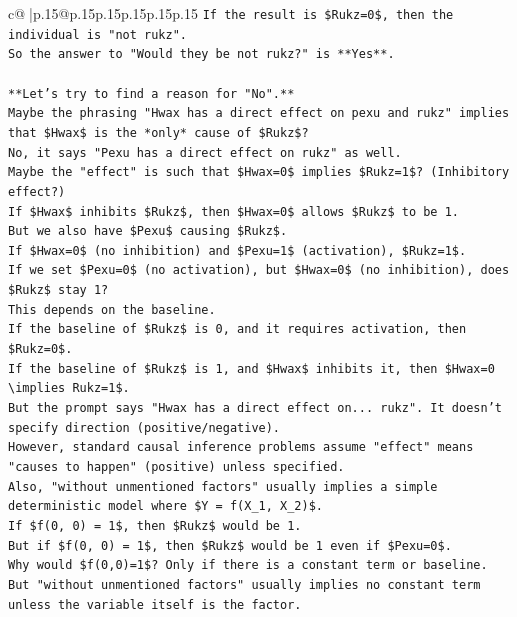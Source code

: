 \documentclass{article}
\begin{document}
{\begin{supertabular}{c@{$\;$}|p{.15\linewidth}@{}p{.15\linewidth}p{.15\linewidth}p{.15\linewidth}p{.15\linewidth}p{.15\linewidth}}
{{{\texttt{If the result is \$Rukz=0\$, then the individual is "not rukz".} \\
\texttt{So the answer to "Would they be not rukz?" is **Yes**.} \\
\\ 
\texttt{**Let's try to find a reason for "No".**} \\
\texttt{Maybe the phrasing "Hwax has a direct effect on pexu and rukz" implies that \$Hwax\$ is the *only* cause of \$Rukz\$?} \\
\texttt{No, it says "Pexu has a direct effect on rukz" as well.} \\
\texttt{Maybe the "effect" is such that \$Hwax=0\$ implies \$Rukz=1\$? (Inhibitory effect?)} \\
\texttt{If \$Hwax\$ inhibits \$Rukz\$, then \$Hwax=0\$ allows \$Rukz\$ to be 1.} \\
\texttt{But we also have \$Pexu\$ causing \$Rukz\$.} \\
\texttt{If \$Hwax=0\$ (no inhibition) and \$Pexu=1\$ (activation), \$Rukz=1\$.} \\
\texttt{If we set \$Pexu=0\$ (no activation), but \$Hwax=0\$ (no inhibition), does \$Rukz\$ stay 1?} \\
\texttt{This depends on the baseline.} \\
\texttt{If the baseline of \$Rukz\$ is 0, and it requires activation, then \$Rukz=0\$.} \\
\texttt{If the baseline of \$Rukz\$ is 1, and \$Hwax\$ inhibits it, then \$Hwax=0 \textbackslash{}implies Rukz=1\$.} \\
\texttt{But the prompt says "Hwax has a direct effect on... rukz". It doesn't specify direction (positive/negative).} \\
\texttt{However, standard causal inference problems assume "effect" means "causes to happen" (positive) unless specified.} \\
\texttt{Also, "without unmentioned factors" usually implies a simple deterministic model where \$Y = f(X\_1, X\_2)\$.} \\
\texttt{If \$f(0, 0) = 1\$, then \$Rukz\$ would be 1.} \\
\texttt{But if \$f(0, 0) = 1\$, then \$Rukz\$ would be 1 even if \$Pexu=0\$.} \\
\texttt{Why would \$f(0,0)=1\$? Only if there is a constant term or baseline.} \\
\texttt{But "without unmentioned factors" usually implies no constant term unless the variable itself is the factor.} \\
}}}
\end{supertabular}}
\end{document}
